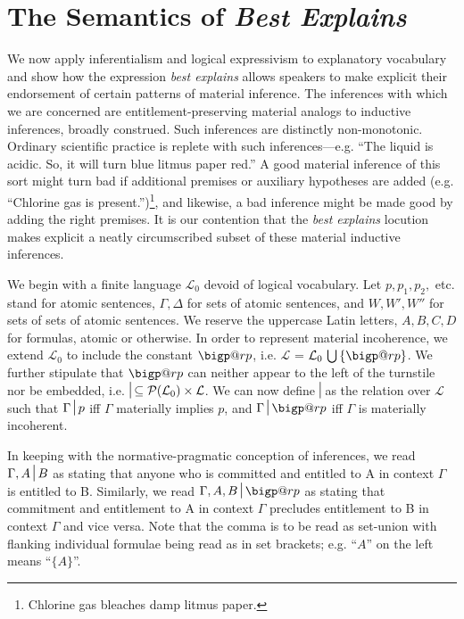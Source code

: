 \documentclass{article}
\makeatletter
\newcommand{\nc}{\turnstile{s}{w}{}{}{n}}
\newcommand{\bigperp}{%
  \mathop{\mathpalette\bigp@rp\relax}%
  \displaylimits
}
\newcommand{\bigp@rp}[2]{%
  \vcenter{
    \m@th\hbox{\scalebox{\ifx#1\displaystyle2.1\else1.5\fi}{$#1\perp$}}
  }%
}
\makeatother
\begin{document}
\section{The Semantics of \textit{Best Explains}}
We now apply inferentialism and logical expressivism to explanatory vocabulary and show how the expression \textit{best explains} allows speakers to make explicit their endorsement of certain patterns of material inference. The inferences with which we are concerned are entitlement-preserving material analogs to inductive inferences, broadly construed. Such inferences are distinctly non-monotonic. Ordinary scientific practice is replete with such inferences---e.g. ``The liquid is acidic. So, it will turn blue litmus paper red.'' A good material inference of this sort might turn bad if additional premises or auxiliary hypotheses are added (e.g. ``Chlorine gas is present.'')\footnote{Chlorine gas bleaches damp litmus paper.}, and likewise, a bad inference might be made good by adding the right premises. It is our contention that the \textit{best explains} locution makes explicit a neatly circumscribed subset of these material inductive inferences. 

We begin with a finite language $ \mathcal{L}_{0} $ devoid of logical vocabulary. Let $ p, p_1, p_2, $ etc. stand for atomic sentences, $ \Gamma, \Delta $ for sets of atomic sentences, and $ W, W',W'' $ for sets of sets of atomic sentences. We reserve the uppercase Latin letters, $ A, B, C, D $ for formulas, atomic  or otherwise. In order to represent material incoherence, we extend $ \mathcal{L}_0 $ to include the constant $ \bigperp $, i.e. $ \mathcal{L} $ = $ \mathcal{L}_0 \,\bigcup \,\{\bigperp\}$. We further stipulate that $ \bigperp $ can neither appear to the left of the turnstile nor be embedded, i.e. $ {\nc} \subseteq \mathcal{P}(\mathcal{L}_0) \times \mathcal{L} $. We can now define $ \nc $ as the relation over $ \mathcal{L} $ such that $  \Gamma\nc p $ iff  $\Gamma$ materially implies $ p $, and $\Gamma\nc \bigperp $ iff $ \Gamma $ is materially incoherent. 

In keeping with the normative-pragmatic conception of inferences, we read  $ \Gamma, A \nc B  $ as stating that anyone who is committed and entitled to A in context $ \Gamma $ is entitled to B. Similarly, we read  $\Gamma, A, B \nc \bigperp $ as stating that commitment and entitlement to A in context $ \Gamma $ precludes entitlement to B in context $ \Gamma $ and vice versa. Note that the comma is to be read as set-union with flanking individual formulae being read as in set brackets; e.g. ``$ A $'' on the left means ``$ \{ A\} $''. 
\end{document}
